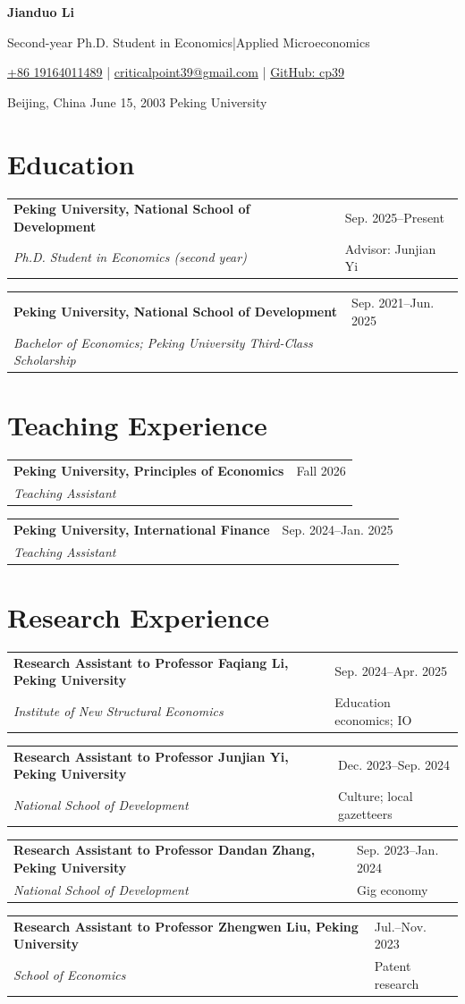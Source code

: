 \documentclass[10pt,a4paper]{article}
\makeatletter
\newcommand{\ResumeName}{Jianduo Li}
\newcommand{\Phone}{+86 19164011489}
\newcommand{\Email}{criticalpoint39@gmail.com}
\newcommand{\GithubID}{cp39}
\newcommand{\PhDInstitution}{Peking University}
\newcommand{\PhDSchool}{National School of Development}
\newcommand{\PhDStart}{Sep. 2025}
\newcommand{\BachelorEnd}{Jun. 2025}
\newcommand{\eduentry}[4]{%
  \begin{tabularx}{\textwidth}{@{}>{\raggedright\arraybackslash}X@{\hspace{0.6em}}>{\raggedleft\arraybackslash}p{3.9cm}@{}}
    \textbf{#1} & \textcolor{Muted}{#2} \\
    \textit{#3} & \textcolor{Muted}{#4}
  \end{tabularx}\par\vspace{-0.18em}
}
\makeatother
\begin{document}
\raggedright

\begin{center}
  {\fontsize{24}{27}\selectfont\bfseries\color{Accent}\ResumeName}\par
  \vspace{0.16em}
  {\small Second-year Ph.D. Student in Economics\enspace\textcolor{Accent!60}{|}\enspace Applied Microeconomics}\par
  \vspace{0.38em}
  {\small
    \href{tel:+8619164011489}{\Phone}
    \enspace\textcolor{Muted}{|}\enspace
    \href{mailto:\Email}{\Email}
    \enspace\textcolor{Muted}{|}\enspace
    \href{https://github.com/\GithubID}{GitHub: \GithubID}
  }\par
  \vspace{0.14em}
  {\small\textcolor{Muted}{Beijing, China \enspace\textbar\enspace June 15, 2003 \enspace\textbar\enspace \PhDInstitution}}
\end{center}

\vspace{-0.35em}
\section*{Education}
\eduentry{\PhDInstitution, \PhDSchool}{\PhDStart--Present}{Ph.D. Student in Economics (second year)}{Advisor: Junjian Yi}
\eduentry{Peking University, National School of Development}{Sep. 2021--\BachelorEnd}{Bachelor of Economics; Peking University Third-Class Scholarship}{}

\section*{Teaching Experience}
\eduentry{Peking University, Principles of Economics}{Fall 2026}{Teaching Assistant}{}
\eduentry{Peking University, International Finance}{Sep. 2024--Jan. 2025}{Teaching Assistant}{}

\section*{Research Experience}
\eduentry{Research Assistant to Professor Faqiang Li, Peking University}{Sep. 2024--Apr. 2025}{Institute of New Structural Economics}{Education economics; IO}
\eduentry{Research Assistant to Professor Junjian Yi, Peking University}{Dec. 2023--Sep. 2024}{National School of Development}{Culture; local gazetteers}
\eduentry{Research Assistant to Professor Dandan Zhang, Peking University}{Sep. 2023--Jan. 2024}{National School of Development}{Gig economy}
\eduentry{Research Assistant to Professor Zhengwen Liu, Peking University}{Jul.--Nov. 2023}{School of Economics}{Patent research}
\end{document}
